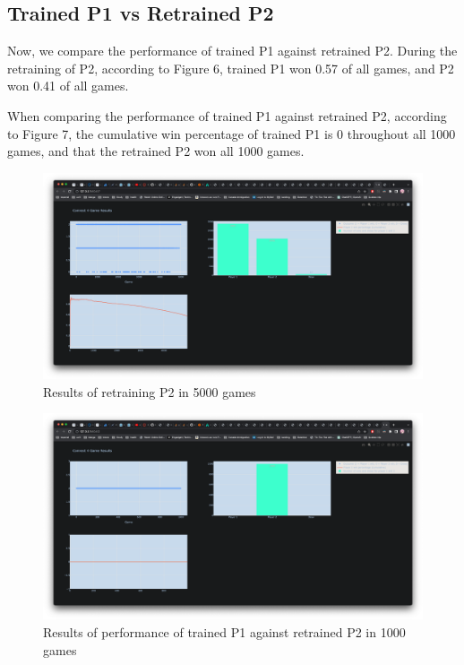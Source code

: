 \documentclass{article}
\begin{document}
\subsection{Trained P1 vs Retrained P2}

Now, we compare the performance of trained P1 against retrained P2.
During the retraining of P2, according to Figure 6, trained P1 won 0.57 of all games, and P2 won 0.41 of all games. 

When comparing the performance of trained P1 against retrained P2, according to Figure 7, the cumulative win percentage of trained P1 is 0 throughout all 1000 games, and that the retrained P2 won all 1000 games. 

\begin{figure}[H]
    \centering
    \includegraphics[scale=0.24]{images/6.png}
    \caption{Results of retraining P2 in 5000 games}
    \label{fig:my_label}
\end{figure}

\begin{figure}[H]
    \centering
    \includegraphics[scale=0.24]{images/7.png}
    \caption{Results of performance of trained P1 against retrained P2 in 1000 games}
    \label{fig:my_label}
\end{figure}
\end{document}
